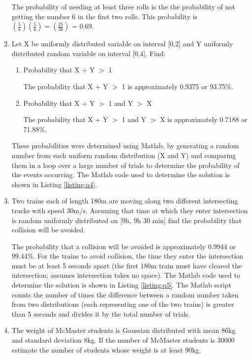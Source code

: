 \documentclass[12pt]{article}
\begin{document}
\begin{enumerate}
    The probability of needing at least three rolls is the the probability of not getting the number 6 in the first two rolls. This probability is $(\frac{5}{6})(\frac{5}{6}) = (\frac{25}{36})$ = 0.69.

    \item Let X be uniformly distributed variable on interval [0,2] and Y uniformly distributed random variable on interval [0,4]. Find:
    \begin{enumerate}
        \item Probability that X + Y $>$ 1

        The probability that X + Y $>$ 1 is approximately 0.9375 or 93.75\%.

        \item Probability that X + Y $>$ 1 and Y $>$ X

        The probability that X + Y $>$ 1 and Y $>$ X is approximately 0.7188 or 71.88\%.
    \end{enumerate}
    These probabilities were determined using Matlab, by generating a random number from each uniform random distribution (X and Y) and comparing them in a loop over a large number of trials to determine the probability of the events occurring. The Matlab code used to determine the solution is shown in Listing \ref{listing:q4}.
    

    \item Two trains each of length 180m are moving along two different intersecting tracks with speed 30m/s. Assuming that time at which they enter intersection is random uniformly distributed on [9h, 9h 30 min] find the probability that collision will be avoided.

    The probability that a collision will be avoided is approximately 0.9944 or 99.44\%. For the trains to avoid collision, the time they enter the intersection must be at least 5 seconds apart (the first 180m train must have cleared the intersection; assumes intersection takes no space). The Matlab code used to determine the solution is shown in Listing \ref{listing:q5}. The Matlab script counts the number of times the difference between a random number taken from two distributions (each representing one of the two trains) is greater than 5 seconds and divides it by the total number of trials.
    

    \item The weight of McMaster students is Gaussian distributed with mean 86kg and standard deviation 8kg. If the number of McMaster students is 30000 estimate the number of students whose weight is at least 90kg.


\end{enumerate}
\end{document}
